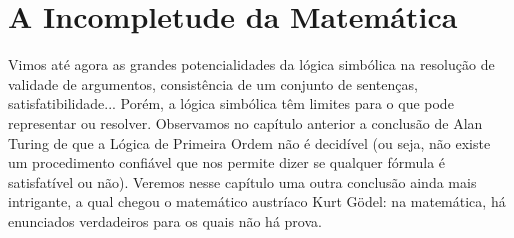 \chapter{A Incompletude da Matemática}

Vimos até agora as grandes potencialidades da lógica simbólica na resolução de validade de argumentos, consistência de um conjunto de sentenças, satisfatibilidade... Porém, a lógica simbólica têm limites para o que pode representar ou resolver. Observamos no capítulo anterior a conclusão de Alan Turing de que a Lógica de Primeira Ordem não é decidível (ou seja, não existe um procedimento confiável que nos permite dizer se qualquer fórmula é satisfatível ou não). Veremos nesse capítulo uma outra conclusão ainda mais intrigante, a qual chegou o matemático austríaco Kurt Gödel: na matemática, há enunciados verdadeiros para os quais não há prova.



